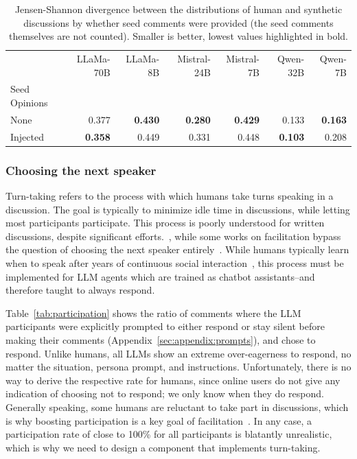 \begin{table}[ht]
	\caption{Jensen-Shannon divergence between the \diversity distributions  of human and synthetic discussions by whether seed comments were provided (the seed comments themselves are not counted). Smaller is better, lowest values highlighted in bold.}
	\label{tab:divergence-initialization}
	\begin{tabular}{lrrrrrr}
		\toprule
		& LLaMa-70B & LLaMa-8B & Mistral-24B & Mistral-7B & Qwen-32B & Qwen-7B \\
		Seed Opinions &  &  &  &  &  &  \\
		\midrule
		None & 0.377 & \textbf{0.430} & \textbf{0.280} & \textbf{0.429} & 0.133 & \textbf{0.163} \\
		Injected & \textbf{0.358} & 0.449 & 0.331 & 0.448 & \textbf{0.103} & 0.208 \\
		\bottomrule
	\end{tabular}
\end{table}


\subsubsection{Choosing the next speaker}
\label{sec:methodology:management:turn-taking}

Turn-taking refers to the process with which humans take turns speaking in a discussion. The goal is typically to minimize idle time in discussions, while letting most participants participate. This process is poorly understood for written discussions, despite significant efforts.~\cite{frai_turn_taking}, while some works on facilitation bypass the question  of choosing the next speaker entirely~\cite{cho-etal-2024-language}. While humans typically learn when to speak after years of continuous social interaction~\cite{frai_turn_taking}, this process must be implemented for LLM agents which are trained as chatbot assistants--and therefore taught to always respond. 

Table~\ref{tab:participation} shows the ratio of comments where the LLM participants were explicitly prompted to either respond or stay silent before making their comments (Appendix~\ref{sec:appendix:prompts}), and chose to respond. Unlike humans, all LLMs show an extreme over-eagerness to respond, no matter the situation, persona prompt, and instructions. Unfortunately, there is no way to derive the respective rate for humans, since online users do not give any indication of choosing not to respond; we only know when they do respond. Generally speaking, some humans are reluctant to take part in discussions, which is why boosting participation is a key goal of facilitation~\cite{schroeder-etal-2024-fora,korre2025evaluation}. In any case, a participation  rate of close to 100\% for all participants is blatantly unrealistic, which is why we need to design a component that implements turn-taking.


